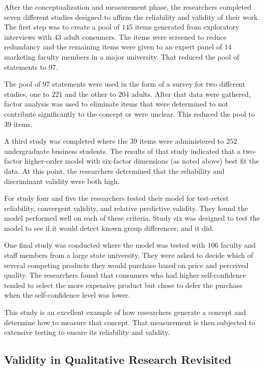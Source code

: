 After the conceptualization and measurement phase, the researchers completed seven different studies designed to affirm the reliability and validity of their work. The first step was to create a pool of $ 145 $ items generated from exploratory interviews with $ 43 $ adult consumers. The items were screened to reduce redundancy and the remaining items were given to an expert panel of $ 14 $ marketing faculty members in a major university. That reduced the pool of statements to $ 97 $.

The pool of $ 97 $ statements were used in the form of a survey for two different studies, one to $ 221 $ and the other to $ 204 $ adults. After that data were gathered, factor analysis was used to eliminate items that were determined to not contribute significantly to the concept or were unclear. This reduced the pool to $ 39 $ items. 

A third study was completed where the $ 39 $ items were administered to $ 252 $ undergraduate business students. The results of that study indicated that a two-factor higher-order model with six-factor dimensions (as noted above) best fit the data. At this point, the researchers determined that the reliability and discriminant validity were both high.

For study four and five the researchers tested their model for test-retest reliability, convergent validity, and relative predictive validity. They found the model performed well on each of these criteria. Study six was designed to test the model to see if it would detect known group differences, and it did.

One final study was conducted where the model was tested with $ 106 $ faculty and staff members from a large state university. They were asked to decide which of several competing products they would purchase based on price and perceived quality. The researchers found that consumers who had higher self-confidence tended to select the more expensive product but chose to defer the purchase when the self-confidence level was lower.

This study is an excellent example of how researchers generate a concept and determine how to measure that concept. That measurement is then subjected to extensive testing to ensure its reliability and validity.



\subsection{Validity in Qualitative Research Revisited}

